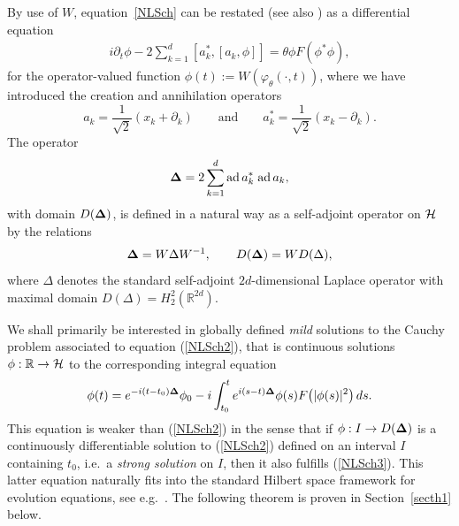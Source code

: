 By use of $W$, equation~\eqref{NLSch} can be restated (see also \cite{DJN})
as a dif\/ferential equation
\begin{gather}
\label{NLSch2}
i\partial_t\phi - 2 \sum_{k=1}^d[a_k^*,[a_k,\phi]] =\theta \phi F(\phi^*\phi) ,
\end{gather}
 for  the operator-valued function $\phi(t) := W(\varphi_\theta(\cdot,t))$,
where we have introduced the creation and annihilation operators
\[
a_k =\frac{1}{\sqrt 2}(x_k + \partial_k)\qquad\mbox{and}\qquad a_k^* =
\frac{1}{\sqrt 2}(x_k - \partial_k) .
\]
The operator
\[
{\bf \Delta} = 2 \sum_{k=1}^d \mbox{ad}\, a_k^*\;\mbox{ad}\, a_k,
\]
with domain $D({\bf\Delta})$,
is def\/ined in a natural way as a self-adjoint operator on $\cal H$ by the
relations
\begin{gather}
\label{tria}
{\bf \Delta} =  W\Delta W^{-1} ,\qquad D({\bf \Delta})=WD(\Delta) ,
\end{gather}
where $\Delta$ denotes the standard self-adjoint $2d$-dimensional Laplace
operator with maximal domain $D(\Delta)=H_2^2(\mathbb R^{2d})$.

We shall primarily be interested in globally def\/ined \emph{mild}
solutions to the Cauchy problem associated to
equation (\ref{NLSch2}), that is continuous solutions $\phi:\mathbb
R\to{\cal H}$ to the corresponding integral equation
\begin{gather}
\label{NLSch3}
\phi(t) = e^{-i(t-t_0){\bf \Delta}}\phi_0 - i\int_{t_0}^t e^{i(s-t){\bf \Delta}}
\phi(s) F\big(|\phi(s)|^2\big)\,ds .
\end{gather}
This equation is weaker than (\ref{NLSch2}) in the sense that if
$\phi: I\to D({\bf \Delta})$ is a continuously dif\/ferentiable solution to
(\ref{NLSch2}) def\/ined on an interval $I$ containing $t_0$, i.e.\ a
\emph{strong solution} on $I$, then it also fulf\/ills (\ref{NLSch3}).
This latter equation  naturally f\/its into
the standard Hilbert space framework for evolution equations, see
e.g.~\cite{RS,Reed}. The following theorem is proven in Section~\ref{secth1}
below.

